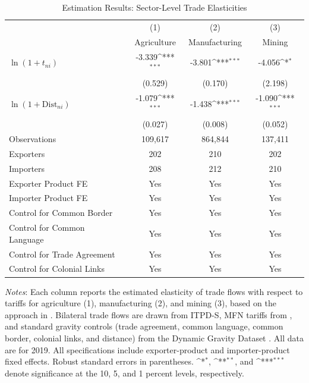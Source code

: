 \documentclass[12pt]{article}
\begin{document}
\begin{table}[htbp]
\caption{Estimation Results: Sector-Level Trade Elasticities}\label{tab:elasticities}
\centering
{
\def\sym#1{\ifmmode^{#1}\else\(^{#1}\)\fi}
\begin{tabular}{l*{3}{c}}
\toprule
                    &\multicolumn{1}{c}{(1)}&\multicolumn{1}{c}{(2)}&\multicolumn{1}{c}{(3)}\\
                    &\multicolumn{1}{c}{Agriculture}&\multicolumn{1}{c}{Manufacturing}&\multicolumn{1}{c}{Mining}\\
\midrule
$ \ln (1+ t_{ni}) $ &      -3.339\sym{***}&      -3.801\sym{***}&      -4.056\sym{*}  \\
                    &     (0.529)         &     (0.170)         &     (2.198)         \\
\addlinespace
$ \ln (1+ \text{Dist}_{ni}) $&      -1.079\sym{***}&      -1.438\sym{***}&      -1.090\sym{***}\\
                    &     (0.027)         &     (0.008)         &     (0.052)         \\
[2em]
Observations        &     109,617         &     864,844         &     137,411         \\
Exporters           &         202         &         210         &         202         \\
Importers           &         208         &         212         &         210         \\
Exporter Product FE &         Yes         &         Yes         &         Yes         \\
Importer Product FE &         Yes         &         Yes         &         Yes         \\
Control for Common Border&         Yes         &         Yes         &         Yes         \\
Control for Common Language&         Yes         &         Yes         &         Yes         \\
Control for Trade Agreement&         Yes         &         Yes         &         Yes         \\
Control for Colonial Links&         Yes         &         Yes         &         Yes         \\
\bottomrule
\end{tabular}
\begin{flushleft}
\footnotesize{\textit{Notes}: Each column reports the estimated elasticity of trade flows with respect to tariffs for agriculture (1), manufacturing (2), and mining (3),  based on the approach in \citet{fontagne2022tariff}. Bilateral trade flows are drawn from ITPD-S, MFN tariffs from \citet{teti2024missing}, and standard gravity controls (trade agreement, common language, common border, colonial links, and distance) from the Dynamic Gravity Dataset \citep{gurevich2018dynamic}. All data are for 2019. All specifications include exporter-product and importer-product fixed effects. Robust standard errors in parentheses. \sym{*}, \sym{**}, and \sym{***} denote significance at the 10, 5, and 1 percent levels, respectively.}
\end{flushleft}
}
\end{table}
\end{document}
